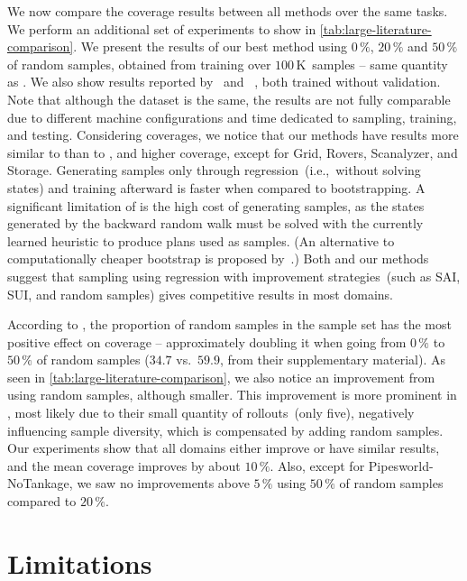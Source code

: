 We now compare the coverage results between all methods over the same tasks. We perform an additional set of experiments to show in \cref{tab:large-literature-comparison}. We present the results of our best method using $0\,\%$, $20\,\%$ and $50\,\%$ of random samples, obtained from training over $100$\,K~samples -- same quantity as \citet{otoole2022sampling}. We also show results reported by \citet{ferber2022neural}~\hboot and \citet{otoole2022sampling}~\hnrsl, both trained without validation. Note that although the dataset is the same, the results are not fully comparable due to different machine configurations and time dedicated to sampling, training, and testing. Considering coverages, we notice that our methods have results more similar to \hnrsl than to \hboot, and higher coverage, except for Grid, Rovers, Scanalyzer, and Storage. Generating samples only through regression~(i.e.,~without solving states) and training afterward is faster when compared to bootstrapping. A significant limitation of \citet{ferber2020neural} is the high cost of generating samples, as the states generated by the backward random walk must be solved with the currently learned heuristic to produce plans used as samples. (An alternative to computationally cheaper bootstrap is proposed by~\citet{lelis2013cluster}.) Both \hnrsl and our methods suggest that sampling using regression with improvement strategies~(such as SAI, SUI, and random samples) gives competitive results in most domains.

According to \citet{otoole2022sampling}, the proportion of random samples in the sample set has the most positive effect on coverage -- approximately doubling it when going from $0\,\%$ to $50\,\%$ of random samples ($34.7$ vs.~$59.9$, from their supplementary material). As seen in \cref{tab:large-literature-comparison}, we also notice an improvement from using random samples, although smaller. This improvement is more prominent in \citet{otoole2022sampling}, most likely due to their small quantity of rollouts~(only five), negatively influencing sample diversity, which is compensated by adding random samples. Our experiments show that all domains either improve or have similar results, and the mean coverage improves by about $10\,\%$. Also, except for Pipesworld-NoTankage, we saw no improvements above $5\,\%$ using $50\,\%$ of random samples compared to $20\,\%$.

\section{Limitations}
\label{sec:limitations}


